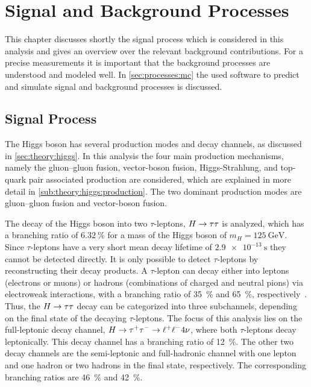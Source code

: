 \chapter{Signal and Background Processes}\label{cha:processes}

This chapter discusses shortly the signal process which is considered in this analysis and gives an overview
over the relevant background contributions.
For a precise measurements it is important that the background processes are understood and modeled well.
In \cref{sec:processes:mc} the used software to predict and simulate signal and background processes is discussed.

\section{Signal Process}\label{sec:processes:signal}

The Higgs boson has several production modes and decay channels, as discussed in \cref{sec:theory:higgs}.
In this analysis the four main production mechanisms, namely the gluon--gluon fusion, vector-boson fusion, Higgs-Strahlung, and
top-quark pair associated production are considered, which are explained in more detail in \cref{sub:theory:higgs:production}.
The two dominant production modes are gluon--gluon fusion and vector-boson fusion.

The decay of the Higgs boson into two $\tau$-leptons, $H \to \tau \tau$ is analyzed, which has a branching ratio of
$\SI{6.32}{\percent}$ for a mass of the Higgs boson of $m_H = \SI{125}{\GeV}$.
Since $\tau$-leptons have a very short mean decay lifetime of $\SI{2.9e-13}{\s}$ they cannot be detected
directly.
It is only possible to detect $\tau$-leptons by reconstructing their decay products.
A $\tau$-lepton can decay either into leptons (electrons or muons) or hadrons (combinations of charged and neutral pions)
via electroweak interactions, with a branching ratio of \SI{35}{\percent} and \SI{65}{\percent}, respectively~\cite{PDG}.
Thus, the $H \to \tau \tau$ decay can be categorized into three subchannels, depending on the final state of the decaying $\tau$-leptons.
The focus of this analysis lies on the full-leptonic decay channel, $H \to \tau^+\tau^- \to \ell^+\ell^- 4\nu$, where both $\tau$-leptons decay leptonically.
This decay channel has a branching ratio of \SI{12}{\percent}.
The other two decay channels are the semi-leptonic and full-hadronic channel with one lepton and one hadron or two hadrons
in the final state, respectively.
The corresponding branching ratios are \SI{46}{\percent} and \SI{42}{\percent}.

